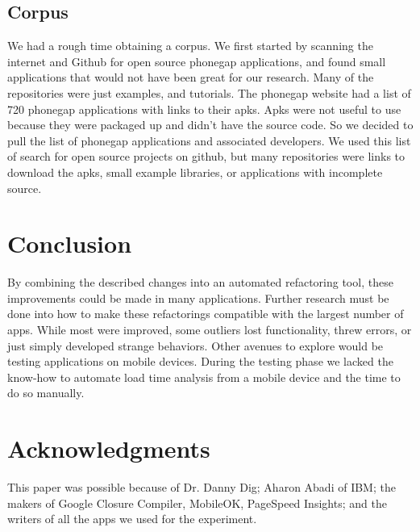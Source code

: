 \documentclass{acm_proc_article-sp}
\begin{document}
\subsection{Corpus}
We had a rough time obtaining a corpus. We first started by scanning the internet and Github for open source phonegap applications, and found small applications that would not have been great for our research. Many of the repositories were just examples, and tutorials. The phonegap website had a list of 720 phonegap applications with links to their apks. Apks were not useful to use because they were packaged up and didn't have the source code. So we decided to pull the list of phonegap applications and associated developers. We used this list of search for open source projects on github, but many repositories were links to download the apks, small example libraries, or applications with incomplete source. 

\section{Conclusion}
By combining the described changes into an automated refactoring tool, these improvements could be made in many applications.
Further research must be done into how to make these refactorings compatible with the largest number of apps.
While most were improved, some outliers lost functionality, threw errors, or just simply developed strange behaviors.
Other avenues to explore would be testing applications on mobile devices.
During the testing phase we lacked the know-how to automate load time analysis from a mobile device and the time to do so manually.
\section{Acknowledgments}
This paper was possible because of Dr. Danny Dig; Aharon Abadi of IBM; the makers of Google Closure Compiler, MobileOK, PageSpeed Insights; and the writers of all the apps we used for the experiment.



\end{document}
